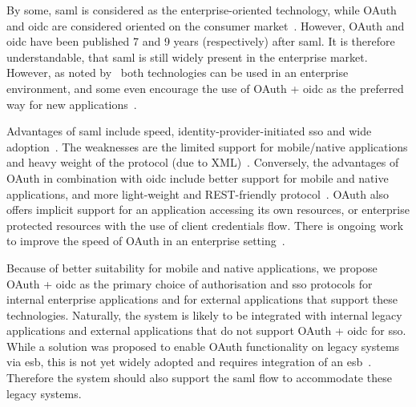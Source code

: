 By some, \acrshort{saml} is considered as the enterprise-oriented technology, while OAuth and \acrshort{oidc} are considered oriented on the consumer market~\cite{Fagbemi2016ComparingWS-Federation, SoftwareSecured2016Differentiating2, OneLoginInc.SAMLOAuth}. However, OAuth and \acrshort{oidc} have been published 7 and 9 years  (respectively) after \acrshort{saml}. It is therefore understandable, that \acrshort{saml} is still widely present in the enterprise market. However, as noted by~\cite{Naik2017SecuringConnect} both technologies can be used in an enterprise environment, and some even encourage the use of OAuth + \acrshort{oidc} as the preferred way for new applications~\cite{barbkess2019SingleDirectory}.

Advantages of \acrshort{saml} include speed, identity-provider-initiated \acrshort{sso} and wide adoption~\cite{OneLoginInc.SAMLOAuth, Naik2017SecuringConnect}. The weaknesses are the limited support for mobile/native applications and heavy weight of the protocol (due to XML)~\cite{Naik2017SecuringConnect}. Conversely, the advantages of OAuth in combination with \acrshort{oidc} include better support for mobile and native applications, and more light-weight and REST-friendly protocol~\cite{Naik2017SecuringConnect}. OAuth also offers implicit support for an application accessing its own resources, or enterprise protected resources with the use of client credentials flow. There is ongoing work to improve the speed of OAuth in an enterprise setting~\cite{Noureddine2011AEnterprise}.

Because of better suitability for mobile and native applications, we propose OAuth + \acrshort{oidc} as the primary choice of authorisation and \acrshort{sso} protocols for internal enterprise applications and for external applications that support these technologies. Naturally, the system is likely to be integrated with internal legacy applications and external applications that do not support OAuth + \acrshort{oidc} for \acrshort{sso}. While a solution was proposed to enable OAuth functionality on legacy systems via \acrfull{esb}, this is not yet widely adopted and requires integration of an \acrshort{esb}~\cite{deSousaRibeiro2018AnBus}. Therefore the system should also support the \acrshort{saml} flow to accommodate these legacy systems.